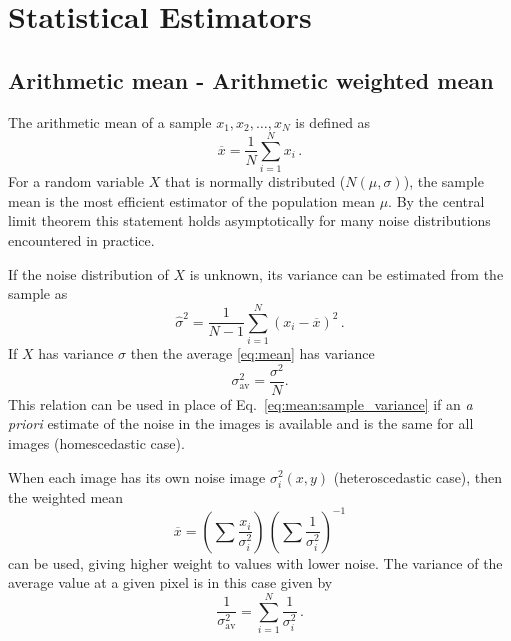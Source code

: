 \section{Statistical Estimators}
\label{chap:algorithms:stat_estimators}

\subsection{Arithmetic mean - Arithmetic weighted mean}
\label{sec:algorithms:robust_mean:mean}

The arithmetic mean of a sample ${x_{1}, x_{2},\dots,x_{N}}$ is
defined as
\begin{equation}
  \label{eq:mean}
  \overline{x}= \frac{1}{N}\sum_{i=1}^{N} x_{i}\,.
\end{equation}
For a random variable $X$ that is normally distributed ($N(\mu,
\sigma)$), the sample mean is the most efficient estimator of the
population mean $\mu$. By the central limit theorem this statement
holds asymptotically for many noise distributions encountered in
practice.

If the noise distribution of $X$ is unknown, its variance can be
estimated from the sample as
\begin{equation}
  \label{eq:mean:sample_variance}
  \hat{\sigma}^{2} = \frac{1}{N-1}\sum_{i=1}^{N}{(x_{i} - \overline{x})^{2}}\,.
\end{equation}
If $X$ has variance $\sigma$ then the average \eqref{eq:mean} has
variance 
\begin{equation}
  \label{eq:mean_variance}
  \sigma_{\mathrm{av}}^{2} = \frac{\sigma^{2}}{N}.
\end{equation}
This relation can be used in place of
Eq.~\eqref{eq:mean:sample_variance} if an \textit{a priori} estimate
of the noise in the images is available and is the same for all images
(homescedastic case).

When each image has its own noise image $\sigma_{i}^{2}(x,y)$
(heteroscedastic case), then the weighted mean
\begin{equation}
  \label{eq:mean_weighted}
  \overline{x} = \left(\sum
    \frac{x_{i}}{\sigma_{i}^{2}} \right)\,\left(\sum
    \frac{1}{\sigma_{i}^{2}}\right)^{-1}
\end{equation}
can be used, giving higher weight to values with lower noise. The
variance of the average value at a given pixel is in this case given
by
\begin{equation}
  \label{eq:average:variance}
  \frac{1}{\sigma_{\mathrm{av}}^{2}} = \sum_{i=1}^{N}\frac{1}{\sigma_{i}^{2}}\,.
\end{equation}


